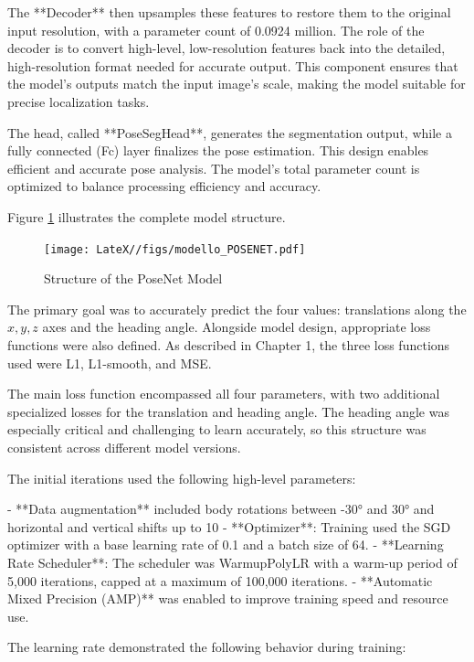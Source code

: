 The **Decoder** then upsamples these features to restore them to the original input resolution, with a parameter count of 0.0924 million. The role of the decoder is to convert high-level, low-resolution features back into the detailed, high-resolution format needed for accurate output. This component ensures that the model’s outputs match the input image's scale, making the model suitable for precise localization tasks.

The head, called **PoseSegHead**, generates the segmentation output, while a fully connected (Fc) layer finalizes the pose estimation. This design enables efficient and accurate pose analysis. The model’s total parameter count is optimized to balance processing efficiency and accuracy.

Figure \ref{fig:enter-label} illustrates the complete model structure.

\begin{figure}
    \centering
    \texttt{[image: LateX//figs/modello\_POSENET.pdf]}
    \caption{Structure of the PoseNet Model}
    \label{fig:enter-label}
\end{figure}

The primary goal was to accurately predict the four values: translations along the \( x, y, z \) axes and the heading angle. Alongside model design, appropriate loss functions were also defined. As described in Chapter 1, the three loss functions used were L1, L1-smooth, and MSE.

The main loss function encompassed all four parameters, with two additional specialized losses for the translation and heading angle. The heading angle was especially critical and challenging to learn accurately, so this structure was consistent across different model versions.

The initial iterations used the following high-level parameters:

- **Data augmentation** included body rotations between -30° and 30° and horizontal and vertical shifts up to 10%
- **Optimizer**: Training used the SGD optimizer with a base learning rate of 0.1 and a batch size of 64.
- **Learning Rate Scheduler**: The scheduler was WarmupPolyLR with a warm-up period of 5,000 iterations, capped at a maximum of 100,000 iterations.
- **Automatic Mixed Precision (AMP)** was enabled to improve training speed and resource use.

The learning rate demonstrated the following behavior during training:

